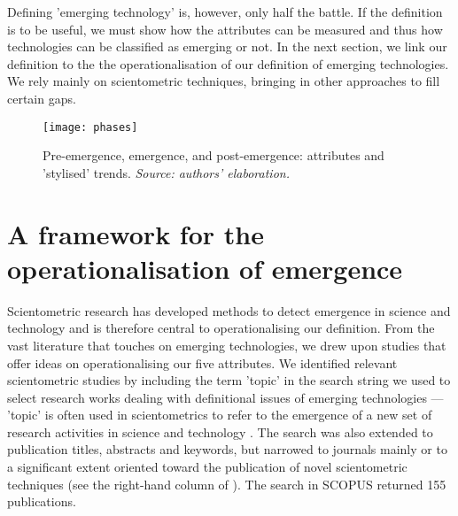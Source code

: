\documentclass[11pt]{article}
\begin{document}
Defining 'emerging technology' is, however, only half the battle.  If the definition is to be useful, we must show how the attributes can be measured and thus how technologies can be classified as emerging or not. In the next section, we  link our definition to the the operationalisation of our definition of emerging technologies.  We rely mainly on scientometric techniques, bringing in other approaches to fill certain gaps. 

\begin{figure}
\texttt{[image: phases]}
\centering
\caption{Pre-emergence, emergence, and post-emergence: attributes and 'stylised' trends. \newline\textit{Source: authors' elaboration.}}
\label{fig:phases}
\end{figure}


\section{A framework for the operationalisation of emergence}
Scientometric research has developed methods to detect emergence in science and technology and is therefore central to operationalising our definition. From the vast literature that touches on emerging technologies, we drew upon studies that offer ideas on operationalising our five attributes. We identified relevant scientometric studies by including the term 'topic' in the search string we used to select research works dealing with definitional issues of emerging technologies ---  'topic' is often used in scientometrics to refer to the emergence of a new set of research activities in science and technology \citep[e.g.][]{Small2014,Glanzel2012}. The search was also extended to publication titles, abstracts and keywords, but narrowed to journals mainly or to a significant extent oriented toward the publication of novel scientometric techniques (see the right-hand column of ). The search in SCOPUS returned 155 publications. 
\end{document}
